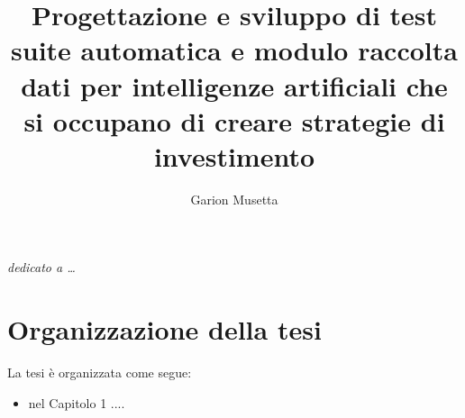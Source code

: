 \documentclass[a4paper,12pt]{report}
\begin{document}
\title{Progettazione e sviluppo di test suite automatica e modulo raccolta dati per intelligenze artificiali che si occupano di creare strategie di investimento}
\author{Garion Musetta}
%
% 
%
\beforepreface
\prefacesection{}
        {\hfill \Large {\sl dedicato a \dots}}
% 
%

%
%
\section*{Organizzazione della tesi}
\label{organizzazione}
La tesi \`e organizzata come segue:
\begin{itemize}
\item nel Capitolo 1 ....
\end{itemize}
%
%

\afterpreface
% 
% 
%
%
\end{document}
